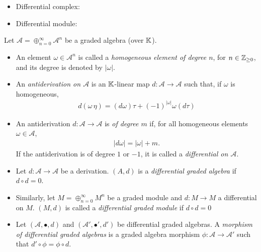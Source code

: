 \begin{definition}
    \begin{itemize}
    
    \item Differential complex:
    
    \item Differential module:
        
    \end{itemize}
\end{definition}

\begin{definition}
Let $\mathcal A = \oplus_{n = 0}^\infty \mathcal A^n$ be a graded algebra (over $\mathbb{K}$).
    \begin{itemize}
    
    \item An element $\omega \in \mathcal A^n$ is called a \emph{homogeneous element of degree $n$}, for $n \in \mathbb{Z}_{\geq 0}$, and its degree is denoted by $|\omega|$.
    
    \item An \emph{antiderivation on $\mathcal A$} is an $\mathbb{K}$-linear map $d: \mathcal A \to \mathcal A$ such that, if $\omega$ is homogeneous, 
    \begin{align*}
        d(\omega \, \eta) = (d\omega)\tau + (-1)^{|\omega|} \omega (d\tau)
    \end{align*}
    
    \item An antiderivation $d: \mathcal A \to \mathcal A$ is \emph{of degree $m$} if, for all homogeneous elements $\omega \in \mathcal A$,
    \begin{align*}
        |d\omega| = |\omega| + m.
    \end{align*}
    If the antiderivation is of degree $1$ or $-1$, it is called a \emph{differential on $\mathcal A$}.
    
    \item Let $d: \mathcal A \to \mathcal A$ be a derivation. $(A, d)$ is a \emph{differential graded algebra} if $d \circ d = 0$. 
    
    \item Similarly, let $M = \oplus_{n = 0}^\infty M^n$ be a graded module and $d: M \to M$ a differential on $M$. $(M, d)$ is called a \emph{differential graded module} if $d \circ d = 0$
    
    \item Let $(\mathcal A, \bullet, d)$ and $(\mathcal A', \bullet', d')$ be differential graded algebras. A \emph{morphism of differential graded algebras} is a graded algebra morphism $\phi: \mathcal A \to \mathcal A'$ such that $d' \circ \phi = \phi \circ d$.
    
    \end{itemize}
    
\end{definition}



